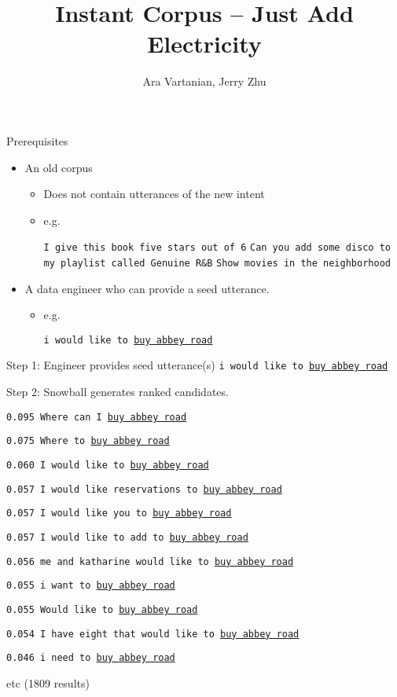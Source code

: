 \documentclass[12pt]{beamer}
\title{Instant Corpus -- Just Add Electricity}
\author[Author]{Ara Vartanian, Jerry Zhu}
\institute{Department of Computer Sciences, University of Wisconsin-Madison}
\begin{document}

\begin{frame}
  \titlepage
\end{frame}

\begin{frame}{Prerequisites}
  \begin{itemize}
    \item An old corpus 
      \begin{itemize}
        \item Does not contain utterances of the new intent
        \item e.g.

          \texttt{I give this book five stars out of 6}
          \texttt{Can you add some disco to my playlist called Genuine R\&B}
          \texttt{Show movies in the neighborhood}
        \end{itemize} 
      \item A data engineer who can provide a seed utterance.
      \begin{itemize}
      \item e.g.

        \texttt{i would like to \underline{buy abbey road}}
      \end{itemize}
  \end{itemize}
\end{frame}
  
\begin{frame}{Step 1: Engineer provides seed utterance(s)}
\texttt{i would like to \underline{buy abbey road}}
\end{frame}
  
\begin{frame}{Step 2: Snowball generates ranked candidates.}

{\small \texttt{0.095 Where can I \underline{buy abbey road}}

\texttt{0.075 Where to \underline{buy abbey road}}

\texttt{0.060 I would like to \underline{buy abbey road}}

\texttt{0.057 I would like reservations to \underline{buy abbey road}}

\texttt{0.057 I would like you to \underline{buy abbey road}}

\texttt{0.057 I would like to add to \underline{buy abbey road}}

\texttt{0.056 me and katharine would like to \underline{buy abbey road}}

\texttt{0.055 i want to \underline{buy abbey road}}

\texttt{0.055 Would like to \underline{buy abbey road}}

\texttt{0.054 I have eight that would like to \underline{buy abbey road}}

\texttt{0.046 i need to \underline{buy abbey road}}

\bigskip 
etc (1809 results)}

\end{frame}
\end{document}
